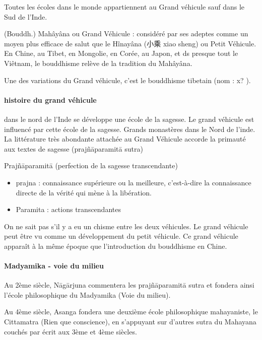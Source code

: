 Toutes les écoles dans le monde appartiennent au Grand véhicule sauf dans le Sud de l'Inde. 

\begin{Def}[dasheng 大乘]
    (Bouddh.) Mahâyâna ou Grand Véhicule : considéré par ses adeptes comme un moyen plus efficace de salut que le Hînayâna (小乘 xiao sheng) ou Petit Véhicule. En Chine, au Tibet, en Mongolie, en Corée, au Japon, et ds presque tout le Viêtnam, le bouddhisme relève de la tradition du Mahâyâna.

    Une des variations du Grand véhicule, c'est le bouddhisme tibetain (nom : x? ).
\end{Def}

\paragraph{histoire du grand véhicule} dans le nord de l'Inde se développe une école de la sagesse. Le grand véhicule est influencé par cette école de la sagesse. Grands monastères dans le Nord de l'inde.
La littérature très abondante attachée au Grand Véhicule accorde la primauté aux textes de sagesse (prajñāparamitā sutra)

\begin{Def}[Prajñāparamitā]
    Prajñāparamitā (perfection de la sagesse transcendante)

    \begin{itemize}
        \item  	prajna : connaissance supérieure ou la meilleure, c’est-à-dire la connaissance directe de la vérité qui mène à la libération.
\item 	Paramita : actions transcendantes
    \end{itemize}

\end{Def}

On ne sait pas s'il y a eu un chisme entre les deux véhicules. Le grand véhicule peut être vu comme un développement du petit véhicule.
Ce grand véhicule apparaît à la même époque que l'introduction du bouddhisme en Chine. 

\paragraph{Madyamika - voie du milieu} 	Au 2ème siècle, Nāgārjuna commentera les prajñāparamitā sutra et fondera ainsi l’école philosophique du Madyamika (Voie du milieu).

 Au 4ème siècle, Asanga fondera une deuxième école philosophique mahayaniste, le Cittamatra (Rien que conscience), en s’appuyant sur d’autres sutra du Mahayana couchés par écrit aux 3ème et 4ème siècles.
 
